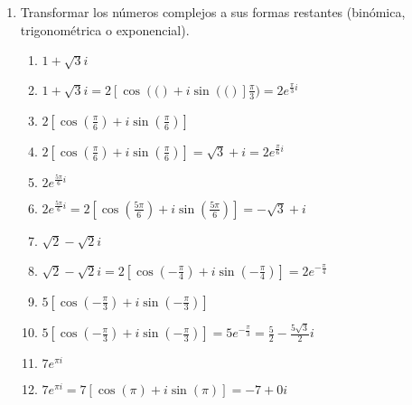 \documentclass[a4paper]{article}
\newcommand{\answer}{\item[**]}
\newcommand{\exercise}{\item}
\newcommand{\df}[2]{\displaystyle\frac{#1}{#2}}
\newcommand{\cis}[1]{\left[\cos\left({#1}\right)+i\sin\left({#1}\right)\right]}
\begin{document}
\begin{enumerate}
\begin{multicols}{3}
\begin{enumerate} [label=(\alph*)]
		\item $-\sqrt{2}$
		\answer $|-\sqrt{2}|=\sqrt{2}$, ~$\arg(-\sqrt{2})=\pi=180^{\circ}$

		\item $4i+2$
		\answer $|4i+2|=2\sqrt{5}$, ~$\arg(4i+2) \simeq 63.44^{\circ}$

		\item $1+\sqrt{2}$
		\answer $|1+\sqrt{2}|=1+\sqrt{2}\simeq 2.4142$, ~$\arg(1+\sqrt{2}) = 0^{\circ}$

		\item $-\df{1}{2}+\df{3}{4}i$
		\answer $\left|-\df{1}{2}+\df{3}{4}i\right|=\df{\sqrt{13}}{4}$, ~$\arg\left(-\df{1}{2}+\df{3}{4}i\right) \simeq 123.69^{\circ}$

		\item $i-4$
		\answer $|i-4|=\sqrt{17}$, ~$\arg(i-4) \simeq 165.96^{\circ}$

		\item $1+\sqrt{2}-\sqrt{3}i$
		\answer $|1+\sqrt{2}-\sqrt{3}i|=\sqrt{6+\sqrt{8}} \simeq 2.9713$, ~$\arg(1+\sqrt{2}-\sqrt{3}i) \simeq -35.657^{\circ}$

	\end{enumerate}
	\end{multicols}

	\exercise Transformar los números complejos a sus formas restantes (binómica, trigonométrica o exponencial).
	\begin{multicols}{3}
	\begin{enumerate} [label=(\alph*)]
		
		\item $1+\sqrt{3}i$
		\answer $1+\sqrt{3}i=2\cis(\df{\pi}{3})=2e^{\frac{\pi}{3}i}$ 

		\item $2 \cis{\df{\pi}{6}}$
		\answer $2 \cis{\df{\pi}{6}}= \sqrt{3}+i= 2e^{\frac{\pi}{6}i}$

		\item $2e^{\frac{5\pi}{6}i}$
		\answer $2e^{\frac{5\pi}{6}i}=2\cis{\df{5\pi}{6}}=-\sqrt{3}+i$

		\item $\sqrt{2}-\sqrt{2}i$
		\answer $\sqrt{2}-\sqrt{2}i=2\cis{-\df{\pi}{4}}=2e^{-\frac{\pi}{4}}$

		\item $5 \cis{-\df{\pi}{3}}$
		\answer $5 \cis{-\df{\pi}{3}}=5e^{-\frac{\pi}{3}}=\df{5}{2}-\df{5\sqrt{3}}{2}i$

		\item $7e^{\pi i}$
		\answer $7e^{\pi i}=7\cis{\pi}=-7+0i$


\end{enumerate}
\end{multicols}
\end{enumerate}
\end{document}
